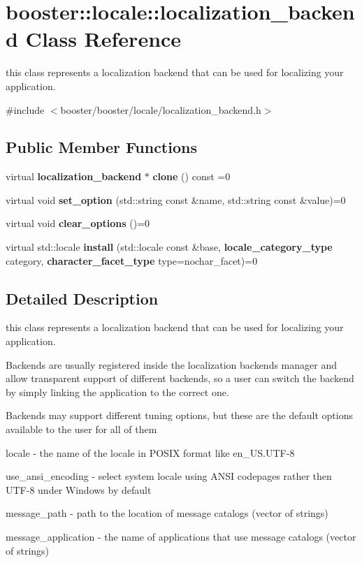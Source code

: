\section{booster\-:\-:locale\-:\-:localization\-\_\-backend \-Class \-Reference}
\label{classbooster_1_1locale_1_1localization__backend}


this class represents a localization backend that can be used for localizing your application.  




{\ttfamily \#include $<$booster/booster/locale/localization\-\_\-backend.\-h$>$}

\subsection*{\-Public \-Member \-Functions}
\begin{DoxyCompactItemize}
\item 
virtual {\bf localization\-\_\-backend} $\ast$ {\bf clone} () const =0
\item 
virtual void {\bf set\-\_\-option} (std\-::string const \&name, std\-::string const \&value)=0
\item 
virtual void {\bf clear\-\_\-options} ()=0
\item 
virtual std\-::locale {\bf install} (std\-::locale const \&base, {\bf locale\-\_\-category\-\_\-type} category, {\bf character\-\_\-facet\-\_\-type} type=nochar\-\_\-facet)=0
\end{DoxyCompactItemize}


\subsection{\-Detailed \-Description}
this class represents a localization backend that can be used for localizing your application. 

\-Backends are usually registered inside the localization backends manager and allow transparent support of different backends, so a user can switch the backend by simply linking the application to the correct one.

\-Backends may support different tuning options, but these are the default options available to the user for all of them


\begin{DoxyEnumerate}
\item {\ttfamily locale} -\/ the name of the locale in \-P\-O\-S\-I\-X format like en\-\_\-\-U\-S.\-U\-T\-F-\/8
\item {\ttfamily use\-\_\-ansi\-\_\-encoding} -\/ select system locale using \-A\-N\-S\-I codepages rather then \-U\-T\-F-\/8 under \-Windows by default
\item {\ttfamily message\-\_\-path} -\/ path to the location of message catalogs (vector of strings)
\item {\ttfamily message\-\_\-application} -\/ the name of applications that use message catalogs (vector of strings)
\end{DoxyEnumerate}

